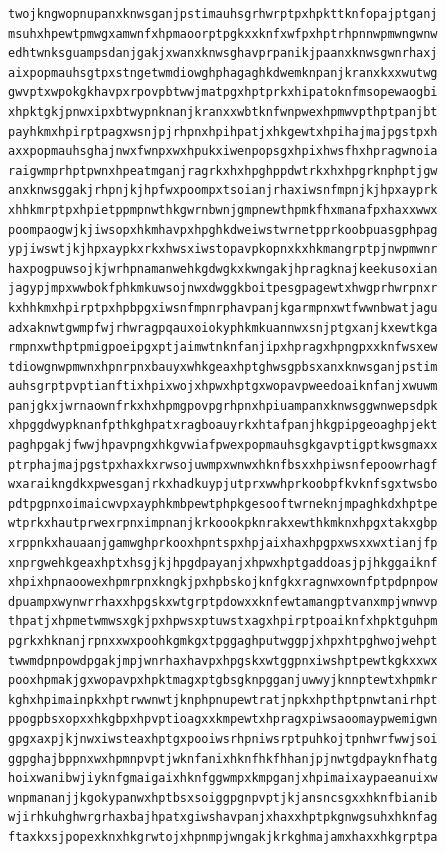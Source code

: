 \documentclass[11pt,letterpaper]{exam}
\begin{document}
\begin{questions}
\begin{verbatim}
twojkngwopnupanxknwsganjpstimauhsgrhwrptpxhpkttknfopajptganj
msuhxhpewtpmwgxamwnfxhpmaoorptpgkxxknfxwfpxhptrhpnnwpmwngwnw
edhtwnksguampsdanjgakjxwanxknwsghavprpanikjpaanxknwsgwnrhaxj
aixpopmauhsgtpxstngetwmdiowghphagaghkdwemknpanjkranxkxxwutwg
gwvptxwpokgkhavpxrpovpbtwwjmatpgxhptprkxhipatoknfmsopewaogbi
xhpktgkjpnwxipxbtwypnknanjkranxxwbtknfwnpwexhpmwvpthptpanjbt
payhkmxhpirptpagxwsnjpjrhpnxhpihpatjxhkgewtxhpihajmajpgstpxh
axxpopmauhsghajnwxfwnpxwxhpukxiwenpopsgxhpixhwsfhxhpragwnoia
raigwmprhptpwnxhpeatmganjragrkxhxhpghppdwtrkxhxhpgrknphptjgw
anxknwsggakjrhpnjkjhpfwxpoompxtsoianjrhaxiwsnfmpnjkjhpxayprk
xhhkmrptpxhpietppmpnwthkgwrnbwnjgmpnewthpmkfhxmanafpxhaxxwwx
poompaogwjkjiwsopxhkmhavpxhpghkdweiwstwrnetpprkoobpuasgphpag
ypjiwswtjkjhpxaypkxrkxhwsxiwstopavpkopnxkxhkmangrptpjnwpmwnr
haxpogpuwsojkjwrhpnamanwehkgdwgkxkwngakjhpragknajkeekusoxian
jagypjmpxwwbokfphkmkuwsojnwxdwggkboitpesgpagewtxhwgprhwrpnxr
kxhhkmxhpirptpxhpbpgxiwsnfmpnrphavpanjkgarmpnxwtfwwnbwatjagu
adxaknwtgwmpfwjrhwragpqauxoiokyphkmkuannwxsnjptgxanjkxewtkga
rmpnxwthptpmigpoeipgxptjaimwtnknfanjipxhpragxhpngpxxknfwsxew
tdiowgnwpmwnxhpnrpnxbauyxwhkgeaxhptghwsgpbsxanxknwsganjpstim
auhsgrptpvptianftixhpixwojxhpwxhptgxwopavpweedoaiknfanjxwuwm
panjgkxjwrnaownfrkxhxhpmgpovpgrhpnxhpiuampanxknwsggwnwepsdpk
xhpggdwypknanfpthkghpatxragboauyrkxhtafpanjhkgpipgeoaghpjekt
paghpgakjfwwjhpavpngxhkgvwiafpwexpopmauhsgkgavptigptkwsgmaxx
ptrphajmajpgstpxhaxkxrwsojuwmpxwnwxhknfbsxxhpiwsnfepoowrhagf
wxaraikngdkxpwesganjrkxhadkuypjutprxwwhprkoobpfkvknfsgxtwsbo
pdtpgpnxoimaicwvpxayphkmbpewtphpkgesooftwrneknjmpaghkdxhptpe
wtprkxhautprwexrpnximpnanjkrkoookpknrakxewthkmknxhpgxtakxgbp
xrppnkxhauaanjgamwghprkooxhpntspxhpjaixhaxhpgpxwsxxwxtianjfp
xnprgwehkgeaxhptxhsgjkjhpgdpayanjxhpwxhptgaddoasjpjhkggaiknf
xhpixhpnaoowexhpmrpnxkngkjpxhpbskojknfgkxragnwxownfptpdpnpow
dpuampxwynwrrhaxxhpgskxwtgrptpdowxxknfewtamangptvanxmpjwnwvp
thpatjxhpmetwmwsxgkjpxhpwsxptuwstxagxhpirptpoaiknfxhpktguhpm
pgrkxhknanjrpnxxwxpoohkgmkgxtpggaghputwggpjxhpxhtpghwojwehpt
twwmdpnpowdpgakjmpjwnrhaxhavpxhpgskxwtggpnxiwshptpewtkgkxxwx
pooxhpmakjgxwopavpxhpktmagxptgbsgknpgganjuwwyjknnptewtxhpmkr
kghxhpimainpkxhptrwwnwtjknphpnupewtratjnpkxhpthptpnwtanirhpt
ppogpbsxopxxhkgbpxhpvptioagxxkmpewtxhpragxpiwsaoomaypwemigwn
gpgxaxpjkjnwxiwsteaxhptgxpooiwsrhpniwsrptpuhkojtpnhwrfwwjsoi
ggpghajbppnxwxhpmnpvptjwknfanixhknfhkfhhanjpjnwtgdpayknfhatg
hoixwanibwjiyknfgmaigaixhknfggwmpxkmpganjxhpimaixaypaeanuixw
wnpmananjjkgokypanwxhptbsxsoiggpgnpvptjkjansncsgxxhknfbianib
wjirhkuhghwrgrhaxbajhpatxgiwshavpanjxhaxxhptpkgnwgsuhxhknfag
ftaxkxsjpopexknxhkgrwtojxhpnmpjwngakjkrkghmajamxhaxxhkgrptpa

\end{verbatim}
\end{questions}
\end{document}
